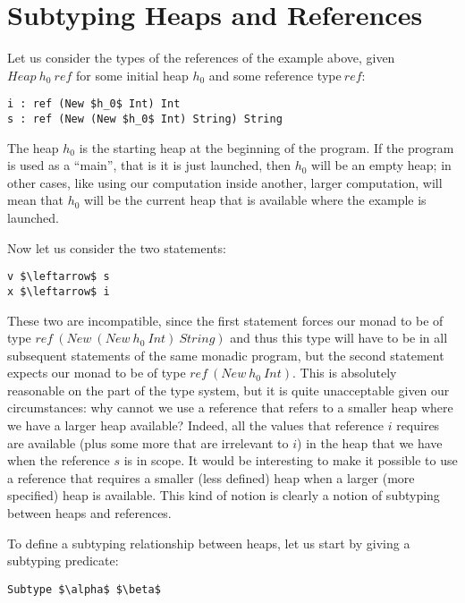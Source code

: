 \documentclass[a4paper]{article}
\begin{document}
\noindent 
\section{Subtyping Heaps and References}

\noindent Let us consider the types of the references of the example above, given $Heap\ h_0\ ref$ for some initial heap $h_0$ and some reference type$\ ref$:

\begin{lstlisting}
i : ref (New $h_0$ Int) Int
s : ref (New (New $h_0$ Int) String) String
\end{lstlisting}

The heap $h_0$ is the starting heap at the beginning of the program. If the program is used as a ``main'', that is it is just launched, then $h_0$ will be an empty heap; in other cases, like using our computation inside another, larger computation, will mean that  $h_0$ will be the current heap that is available where the example is launched.

\noindent Now let us consider the two statements:

\begin{lstlisting}
v $\leftarrow$ s
x $\leftarrow$ i
\end{lstlisting}

These two are incompatible, since the first statement forces our monad to be of type $ref\ \left(New\ \left(New\ h_0\ Int\right)\ String\right)$ and thus this type will have to be in all subsequent statements of the same monadic program, but the second statement expects our monad to be of type $ref\ \left(New\ h_0\ Int\right)$. This is absolutely reasonable on the part of the type system, but it is quite unacceptable given our circumstances: why cannot we use a reference that refers to a smaller heap where we have a larger heap available? Indeed, all the values that reference $i$ requires are available (plus some more that are irrelevant to $i$) in the heap that we have when the reference $s$ is in scope. It would be interesting to make it possible to use a reference that requires a smaller (less defined) heap when a larger (more specified) heap is available. This kind of notion is clearly a notion of subtyping between heaps and references.

\noindent To define a subtyping relationship between heaps, let us start by giving a subtyping predicate:

\begin{lstlisting}
Subtype $\alpha$ $\beta$
\end{lstlisting}
\end{document}
